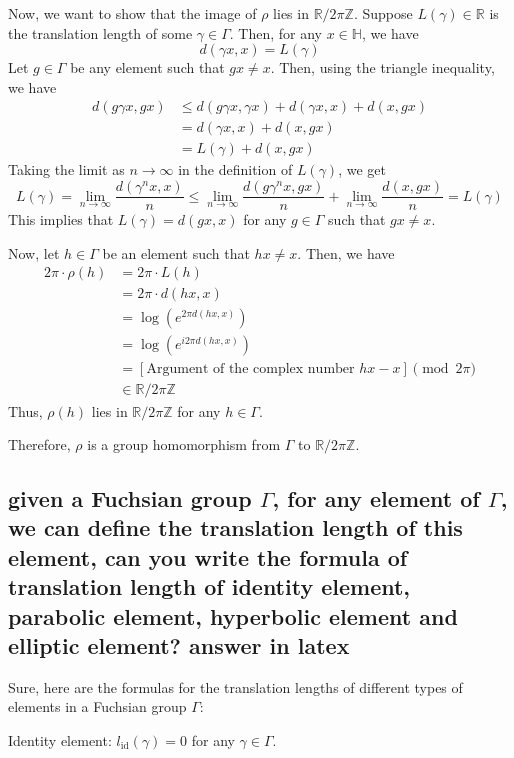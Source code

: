 \documentclass[12pt,a4paper,english]{article}
\theoremstyle{plain}
\theoremstyle{definition}
\theoremstyle{remark}
\begin{document}
Now, we want to show that the image of $\rho$ lies in $\mathbb{R}/2\pi\mathbb{Z}$. Suppose $L(\gamma) \in \mathbb{R}$ is the translation length of some $\gamma \in \Gamma$. Then, for any $x \in \mathbb{H}$, we have $$d(\gamma x, x) = L(\gamma)$$ Let $g \in \Gamma$ be any element such that $gx \neq x$. Then, using the triangle inequality, we have 
\begin{align} d(g\gamma x, gx) &\leq d(g\gamma x, \gamma x) + d(\gamma x, x) + d(x, gx) \\
&= d(\gamma x, x) + d(x, gx) \\
&= L(\gamma) + d(x, gx) 
\end{align} 
Taking the limit as $n \to \infty$ in the definition of $L(\gamma)$, we get $$L(\gamma) = \lim_{n \to \infty} \frac{d(\gamma^n x, x)}{n} \leq \lim_{n \to \infty} \frac{d(g\gamma^n x, gx)}{n} + \lim_{n \to \infty} \frac{d(x, gx)}{n} = L(\gamma)$$ This implies that $L(\gamma) = d(gx, x)$ for any $g \in \Gamma$ such that $gx \neq x$.

Now, let $h \in \Gamma$ be an element such that $hx \neq x$. Then, we have 
\begin{align} 2\pi \cdot \rho(h) &= 2\pi \cdot L(h) \\
&= 2\pi \cdot d(hx, x) \\
&= \log(e^{2\pi d(hx,x)}) \\
&= \log(e^{i2\pi d(hx,x)}) \\ 
&= [\text{Argument of the complex number } hx - x] \pmod{2\pi} \\
&\in \mathbb{R}/2\pi\mathbb{Z} 
\end{align} 
Thus, $\rho(h)$ lies in $\mathbb{R}/2\pi\mathbb{Z}$ for any $h \in \Gamma$.

Therefore, $\rho$ is a group homomorphism from $\Gamma$ to $\mathbb{R}/2\pi\mathbb{Z}$.

\subsection{given a Fuchsian group $\Gamma$, for any element of $\Gamma$, we can define the translation length of this element, can you write the formula of translation length of identity element, parabolic element, hyperbolic element and elliptic element? answer in latex}
Sure, here are the formulas for the translation lengths of different types of elements in a Fuchsian group $\Gamma$:


Identity element: $l_\mathrm{id}(\gamma)=0$ for any $\gamma\in\Gamma$.
\end{document}
